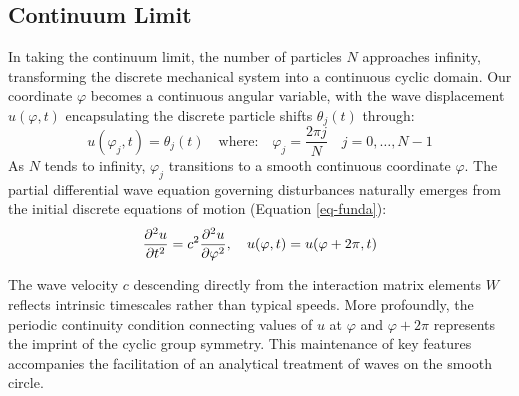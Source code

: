 \documentclass[final,5p,times,twocolumn,authoryear]{elsarticle}
\begin{document}
\subsection{Continuum Limit}
In taking the continuum limit, the number of particles $N$ approaches infinity, transforming the discrete mechanical system into a continuous cyclic domain. Our coordinate $\varphi$ becomes a continuous angular variable, with the wave displacement $u(\varphi,t)$ encapsulating the discrete particle shifts $\theta_j(t) $ through:
\[ u(\varphi_j,t) = \theta_j(t) \quad \text{where:} \quad \varphi_j=\frac{2\pi j}{N} \quad j = 0,\dots,N-1 \]
As $N$ tends to infinity, $\varphi_j$ transitions to a smooth continuous coordinate $\varphi$. The partial differential wave equation governing disturbances naturally emerges from the initial discrete equations of motion (Equation \ref{eq-funda}):
\begin{equation}
	\pdv[order={2}]{u}{t} = c^2 \pdv[order={2}]{u}{\varphi}, \quad u(\varphi,t) = u(\varphi+2\pi,t)
	\label{eq-waveperiodic}
\end{equation}

The wave velocity $c$ descending directly from the interaction matrix elements $W$ reflects intrinsic timescales rather than typical speeds. More profoundly, the periodic continuity condition connecting values of $u $ at $\varphi$ and $\varphi+2\pi$ represents the imprint of the cyclic group symmetry. This maintenance of key features accompanies the facilitation of an analytical treatment of waves on the smooth circle.
\end{document}
